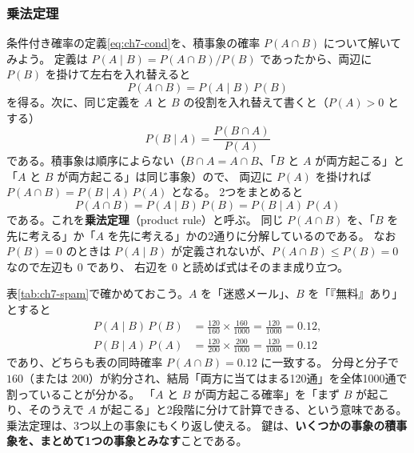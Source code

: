 \subsubsection{乗法定理}

条件付き確率の定義\eqref{eq:ch7-cond}を、積事象の確率 $P(A \cap B)$ について解いてみよう。
定義は $P(A \mid B) = P(A \cap B)/P(B)$ であったから、両辺に $P(B)$ を掛けて左右を入れ替えると
\begin{equation*}
  P(A \cap B) = P(A \mid B)\,P(B)
\end{equation*}
を得る。次に、同じ定義を $A$ と $B$ の役割を入れ替えて書くと（$P(A) > 0$ とする）
\begin{equation*}
  P(B \mid A) = \frac{P(B \cap A)}{P(A)}
\end{equation*}
である。積事象は順序によらない（$B \cap A = A \cap B$、「$B$ と $A$ が両方起こる」と「$A$ と $B$ が両方起こる」は同じ事象）ので、
両辺に $P(A)$ を掛ければ $P(A \cap B) = P(B \mid A)\,P(A)$ となる。
2つをまとめると
\begin{equation}
  P(A \cap B) = P(A \mid B)\,P(B) = P(B \mid A)\,P(A)
  \label{eq:ch7-product}
\end{equation}
である。これを\textbf{乗法定理}（product rule）と呼ぶ。
同じ $P(A \cap B)$ を、「$B$ を先に考える」か「$A$ を先に考える」かの2通りに分解しているのである。
なお $P(B) = 0$ のときは $P(A \mid B)$ が定義されないが、$P(A \cap B) \leq P(B) = 0$ なので左辺も $0$ であり、
右辺を $0$ と読めば式はそのまま成り立つ。

表\ref{tab:ch7-spam}で確かめておこう。$A$ を「迷惑メール」、$B$ を「『無料』あり」とすると
\begin{align*}
  P(A \mid B)\,P(B) &= \frac{120}{160} \times \frac{160}{1000} = \frac{120}{1000} = 0.12, \\
  P(B \mid A)\,P(A) &= \frac{120}{200} \times \frac{200}{1000} = \frac{120}{1000} = 0.12
\end{align*}
であり、どちらも表の同時確率 $P(A \cap B) = 0.12$ に一致する。
分母と分子で $160$（または $200$）が約分され、結局「両方に当てはまる120通」を全体1000通で割っていることが分かる。
「$A$ と $B$ が両方起こる確率」を「まず $B$ が起こり、そのうえで $A$ が起こる」と2段階に分けて計算できる、という意味である。
乗法定理は、3つ以上の事象にもくり返し使える。
鍵は、\textbf{いくつかの事象の積事象を、まとめて1つの事象とみなす}ことである。

